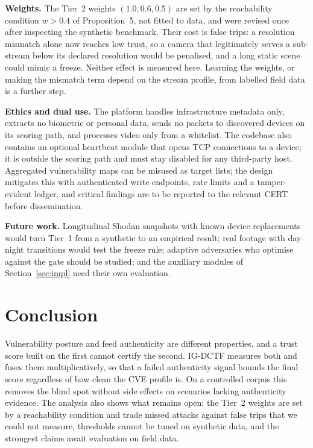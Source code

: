 \documentclass[journal]{IEEEtran}
\begin{document}
\textbf{Weights.} The Tier~2 weights $(1.0,0.6,0.5)$ are set by the reachability condition $w>0.4$ of Proposition~5, not fitted to data, and were revised once after inspecting the synthetic benchmark. Their cost is false trips: a resolution mismatch alone now reaches low trust, so a camera that legitimately serves a sub-stream below its declared resolution would be penalised, and a long static scene could mimic a freeze. Neither effect is measured here. Learning the weights, or making the mismatch term depend on the stream profile, from labelled field data is a further step.

\textbf{Ethics and dual use.} The platform handles infrastructure metadata only, extracts no biometric or personal data, sends no packets to discovered devices on its scoring path, and processes video only from a whitelist. The codebase also contains an optional heartbeat module that opens TCP connections to a device; it is outside the scoring path and must stay disabled for any third-party host. Aggregated vulnerability maps can be misused as target lists; the design mitigates this with authenticated write endpoints, rate limits and a tamper-evident ledger, and critical findings are to be reported to the relevant CERT before dissemination.

\textbf{Future work.} Longitudinal Shodan snapshots with known device replacements would turn Tier~1 from a synthetic to an empirical result; real footage with day--night transitions would test the freeze rule; adaptive adversaries who optimise against the gate should be studied; and the auxiliary modules of Section~\ref{sec:impl} need their own evaluation.

\section{Conclusion}
Vulnerability posture and feed authenticity are different properties, and a trust score built on the first cannot certify the second. IG-DCTF measures both and fuses them multiplicatively, so that a failed authenticity signal bounds the final score regardless of how clean the CVE profile is. On a controlled corpus this removes the blind spot without side effects on scenarios lacking authenticity evidence. The analysis also shows what remains open: the Tier~2 weights are set by a reachability condition and trade missed attacks against false trips that we could not measure, thresholds cannot be tuned on synthetic data, and the strongest claims await evaluation on field data.



\end{document}
